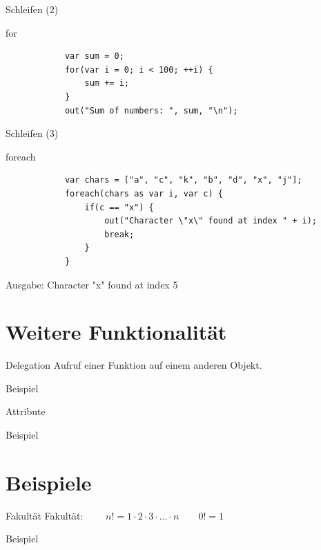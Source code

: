 \documentclass[ucs,9pt]{beamer}
\begin{document}
\begin{frame}[fragile]{Schleifen (2)}
	\begin{block}{for}
		\begin{lstlisting}
			var sum = 0;
			for(var i = 0; i < 100; ++i) {
			    sum += i;
			}
			out("Sum of numbers: ", sum, "\n");
		\end{lstlisting}
	\end{block}
\end{frame}

\begin{frame}[fragile]{Schleifen (3)}
	\begin{block}{foreach}
		\begin{lstlisting}
			var chars = ["a", "c", "k", "b", "d", "x", "j"];
			foreach(chars as var i, var c) {
			    if(c == "x") {
			        out("Character \"x\" found at index " + i);
			        break;
			    }
			}
		\end{lstlisting}
	\end{block}
	Ausgabe: Character "x"{} found at index 5
\end{frame}

\section{Weitere Funktionalität}
\begin{frame}{Delegation}
	Aufruf einer Funktion auf einem anderen Objekt.
	\begin{block}{Beispiel}
		
	\end{block}
\end{frame}

\begin{frame}{Attribute}
	\begin{block}{Beispiel}
		
	\end{block}
\end{frame}

\section{Beispiele}
\begin{frame}{Fakultät}
	Fakultät: $\qquad n! = 1 \cdot 2 \cdot 3 \cdot \ldots \cdot n \qquad 0! = 1$
	\begin{block}{Beispiel}
		
	\end{block}
\end{frame}
\end{document}
